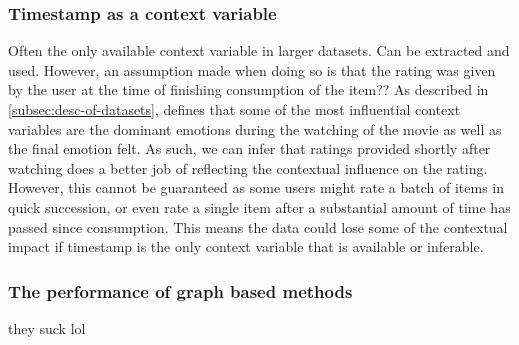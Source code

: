 \subsubsection{Timestamp as a context variable}
Often the only available context variable in larger datasets.
Can be extracted and used.
However, an assumption made when doing so is that the rating was given by the user at the time of finishing consumption of the item??
As described in \autoref{subsec:desc-of-datasets}, \cite{COMODA2013} defines that some of the most influential context variables are the dominant emotions during the watching of the movie as well as the final emotion felt.
As such, we can infer that ratings provided shortly after watching does a better job of reflecting the contextual influence on the rating.
However, this cannot be guaranteed as some users might rate a batch of items in quick succession, or even rate a single item after a substantial amount of time has passed since consumption.
This means the data could lose some of the contextual impact if timestamp is the only context variable that is available or inferable.  
\subsubsection{The performance of graph based methods}
they suck lol


